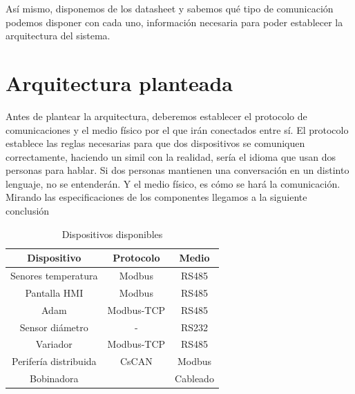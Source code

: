 Así mismo, disponemos de los datasheet y sabemos qué tipo de comunicación podemos disponer con cada uno, información necesaria para poder establecer la arquitectura del sistema.

\section{Arquitectura planteada}
\label{arquitectura}

Antes de plantear la arquitectura, deberemos establecer el protocolo de comunicaciones y el medio físico por el que irán conectados entre sí. El protocolo establece las reglas necesarias para que dos dispositivos se comuniquen correctamente, haciendo un simil con la realidad, sería el idioma que usan dos personas para hablar. Si dos personas mantienen una conversación en un distinto lenguaje, no se entenderán. Y el medio físico, es cómo se hará la comunicación. Mirando las especificaciones de los componentes llegamos a la siguiente conclusión

\begin{table}[H]

\begin{tabular}{ccc}
\hline
{\bf Dispositivo}     & {\bf Protocolo} & {\bf Medio} \\ \hline
Senores temperatura   & Modbus          & RS485       \\
Pantalla HMI          & Modbus          & RS485       \\
Adam                  & Modbus-TCP      & RS485       \\
Sensor diámetro       & -               & RS232       \\
Variador              & Modbus-TCP      & RS485       \\
Perifería distribuida & CsCAN           & Modbus      \\
Bobinadora            &                 & Cableado    \\ \hline
\end{tabular}
\centering
\caption{Dispositivos disponibles}
\label{tab:dispositivos}
\end{table}

